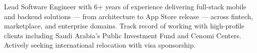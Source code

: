 

\begin{cvparagraph}

Lead Software Engineer with 6+ years of experience delivering full-stack mobile and backend solutions — from architecture to App Store release — across fintech, marketplace, and enterprise domains. Track record of working with high-profile clients including Saudi Arabia's Public Investment Fund and Cenomi Centers. Actively seeking international relocation with visa sponsorship.
\end{cvparagraph}
